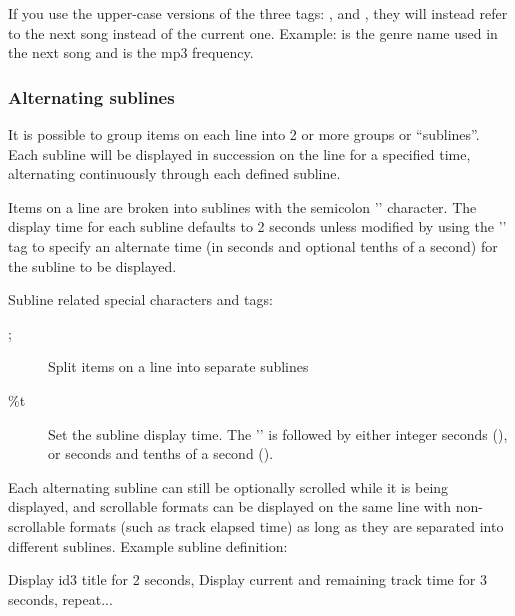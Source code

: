 If you use the upper-case versions of the
three tags: ,  and , they will instead refer to 
the next song instead of the current one. Example:  is the genre 
name used in the next song and  is the mp3 frequency.


\subsubsection{Alternating sublines}

It is possible to group items on each line into 2 or more groups or 
``sublines''. Each subline will be displayed in succession on the line for a 
specified time, alternating continuously through each defined subline.

Items on a line are broken into sublines with the semicolon
'\config{;}' character. The display time for
each subline defaults to 2 seconds unless modified by using the
'' tag to specify an alternate
time (in seconds and optional tenths of a second) for the subline to be
displayed. 

Subline related special characters and tags: 
\begin{description}
\item[;] Split items on a line into separate sublines
\item[\%t] Set the subline display time. The
'' is followed by either integer
seconds (), or seconds and tenths of a second ().
\end{description}

Each alternating subline can still be optionally scrolled while it is
being displayed, and scrollable formats can be displayed on the same
line with non{}-scrollable formats (such as track elapsed time) as long
as they are separated into different sublines.
Example subline definition:
\begin{example}
                                 Display id3 title for 2 seconds,
                                 Display current and remaining track time
                                 for 3 seconds,
                                 repeat...
\end{example}

